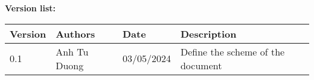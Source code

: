 \textcolor{RFIGreen}{\Large\bf Version list:}


\begin{center}

{\setlength{\extrarowheight}{6pt}
\begin{tabular}{|p{1.5cm}|p{4.5cm}|p{2.5cm}|p{5.5cm}|}
\hline
{\small\bf Version} & {\small\bf Authors} & {\small\bf Date} & {\small\bf Description}\\
\hline
0.1 & Anh Tu Duong & 03/05/2024  & Define the scheme of the document \\
\end{tabular}
}

\end{center}

\newpage
